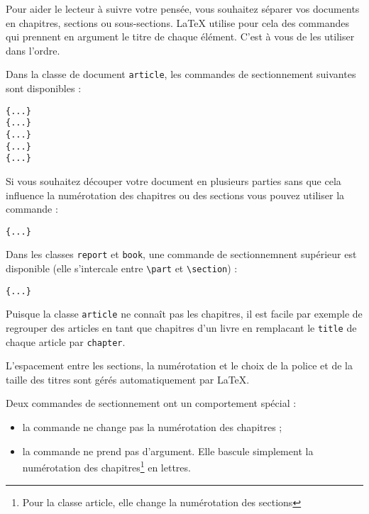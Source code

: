 Pour aider le lecteur à suivre votre pensée, vous souhaitez séparer
vos documents en chapitres, sections ou sous-sections. \LaTeX{}
utilise pour cela des commandes qui prennent en argument le titre de
chaque élément. C'est à vous de les utiliser dans l'ordre.

Dans la classe de document \texttt{article}, les commandes de
sectionnement suivantes sont disponibles : \nopagebreak
\begin{lscommand}
\verb|{...}|\\
\verb|{...}|\\
\verb|{...}|\\
\verb|{...}|\\
\verb|{...}|
\end{lscommand}

Si vous souhaitez découper votre document en plusieurs parties sans que cela influence la
numérotation des chapitres ou des sections vous pouvez utiliser la
commande :
\begin{lscommand}
\verb|{...}|
\end{lscommand}

Dans les classes \texttt{report} et \texttt{book}, une commande de
sectionnemnent supérieur est disponible (elle s'intercale
entre \verb|\part| et \verb|\section|) :
\begin{lscommand}
\verb|{...}|
\end{lscommand}

Puisque la classe \texttt{article} ne connaît pas les chapitres, il
est facile par exemple de regrouper des articles en tant que chapitres
d'un livre en remplacant le \texttt{\bs title} de chaque article par
\texttt{\bs chapter}.

L'espacement entre les sections, la numérotation et le
choix de la police et de la taille des titres sont gérés
automatiquement par \LaTeX{}.

Deux commandes de sectionnement ont un comportement spécial :
\begin{itemize}
\item la commande  ne change pas la numérotation des
      chapitres ;
\item la commande  ne prend pas d'argument. Elle bascule
      simplement la numérotation des chapitres\footnote{Pour la classe
      article, elle change la numérotation des sections} en lettres.
\end{itemize}

